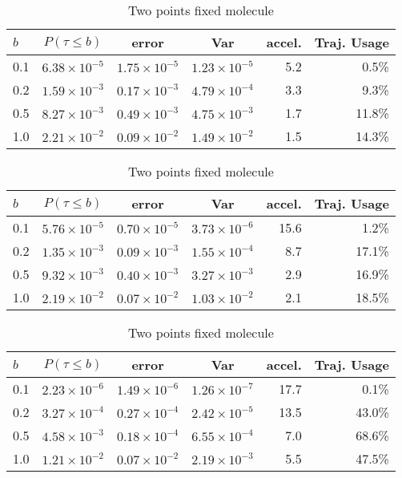 \documentclass[aip,jcp,a4paper,reprint,onecolumn]{revtex4-1}
\begin{document}
\begin{table}[th]
  \centering
  \caption{Free molecule}
  \begin{tabular*}{0.8\textwidth}{@{\extracolsep{\fill}}lcccrr}
    \hline\hline
    $b$ & $P (\tau \leq b)$ & error & Var & accel. & Traj. Usage \\\hline
    0.1 & $6.38\times 10^{-5}$ & $1.75\times 10^{-5}$ & $1.23\times10^{-5}$ & 5.2 & 0.5\%\\
    0.2 & $1.59\times 10^{-3}$ & $0.17\times 10^{-3}$ & $4.79\times10^{-4}$ & 3.3 & 9.3\%\\
    0.5 & $8.27\times 10^{-3}$ & $0.49\times 10^{-3}$ & $4.75\times10^{-3}$ & 1.7 &11.8\%\\
    1.0 & $2.21\times 10^{-2}$ & $0.09\times 10^{-2}$ & $1.49\times10^{-2}$ & 1.5 &14.3\%\\
    \hline\hline
  \end{tabular*}
  \label{tab:tmp1}
  \caption{Free molecule after variance reduction}
  \begin{tabular*}{0.8\textwidth}{@{\extracolsep{\fill}}lcccrr}
    \hline\hline
    $b$ & $P (\tau \leq b)$ & error & Var & accel. & Traj. Usage \\\hline
    0.1 & $5.76\times 10^{-5}$ & $0.70\times 10^{-5}$ & $3.73\times10^{-6}$ &15.6 & 1.2\%\\
    0.2 & $1.35\times 10^{-3}$ & $0.09\times 10^{-3}$ & $1.55\times10^{-4}$ & 8.7 &17.1\%\\
    0.5 & $9.32\times 10^{-3}$ & $0.40\times 10^{-3}$ & $3.27\times10^{-3}$ & 2.9 &16.9\%\\
    1.0 & $2.19\times 10^{-2}$ & $0.07\times 10^{-2}$ & $1.03\times10^{-2}$ & 2.1 &18.5\%\\
    \hline\hline
  \end{tabular*}
  \caption{Two points fixed molecule}
  \begin{tabular*}{0.8\textwidth}{@{\extracolsep{\fill}}lcccrr}
    \hline\hline
    $b$ & $P (\tau \leq b)$ & error & Var & accel. & Traj. Usage \\\hline
    0.1 & $2.23\times 10^{-6}$ & $1.49\times 10^{-6}$ & $1.26\times10^{-7}$ & 17.7 & 0.1\%\\
    0.2 & $3.27\times 10^{-4}$ & $0.27\times 10^{-4}$ & $2.42\times10^{-5}$ & 13.5  & 43.0\%\\
    0.5 & $4.58\times 10^{-3}$ & $0.18\times 10^{-4}$ & $6.55\times10^{-4}$ & 7.0 & 68.6\%\\
    1.0 & $1.21\times 10^{-2}$ & $0.07\times 10^{-2}$ & $2.19\times10^{-3}$ & 5.5  & 47.5\%\\

\end{tabular*}
\end{table}
\end{document}
